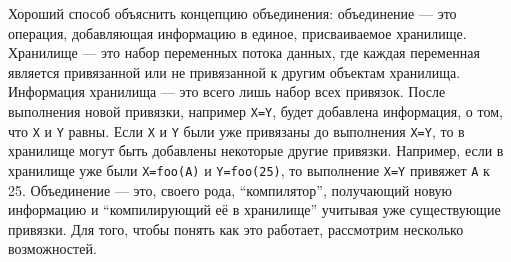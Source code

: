 Хороший способ объяснить концепцию объединения: объединение --- это операция, добавляющая информацию в единое, присваиваемое хранилище. Хранилище --- это набор переменных потока данных, где каждая переменная является привязанной или не привязанной к другим объектам хранилища. Информация хранилища --- это всего лишь набор всех привязок. После выполнения новой привязки, например \lstinline!X=Y!, будет добавлена информация, о том, что \lstinline!X! и \lstinline!Y! равны. Если \lstinline!X! и \lstinline!Y! были уже привязаны до выполнения \lstinline!X=Y!, то в хранилище могут быть добавлены некоторые другие привязки. Например, если в хранилище уже были \lstinline!X=foo(A)! и \lstinline!Y=foo(25)!, то выполнение \lstinline!X=Y! привяжет \lstinline!A! к 25. Объединение --- это, своего рода, ``компилятор'', получающий новую информацию и ``компилирующий её в хранилище'' учитывая уже существующие привязки. Для того, чтобы понять как это работает, рассмотрим несколько возможностей.

